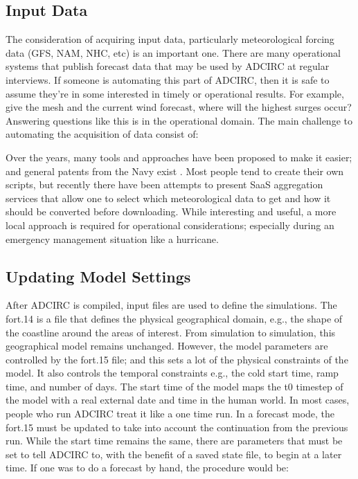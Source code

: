 \documentclass{article}
\begin{document}
\subsection{Input Data}

The consideration of acquiring input data, particularly meteorological forcing
data (GFS, NAM, NHC, etc) is an important one. There are many operational
systems that publish forecast data that may be used by ADCIRC at regular
interviews. If someone is automating this part of ADCIRC, then it is safe to
assume they're in some interested in timely or operational results. For example,
give the mesh and the current wind forecast, where will the highest surges
occur? Answering questions like this is in the operational domain.  The main
challenge to automating the acquisition of data consist of:

Over the years, many tools and approaches have been proposed to make it easier;
and general patents from the Navy exist \cite{}. Most people tend to create
their own scripts, but recently there have been attempts to present SaaS
aggregation services that allow one to select which meteorological data to get
and how it should be converted before downloading. While interesting and useful,
a more local approach is required for operational considerations; especially
during an emergency management situation like a hurricane.

\subsection{Updating Model Settings}

After ADCIRC is compiled, input files are used to define the simulations. The
fort.14 is a file that defines the physical geographical domain, e.g., the shape
of the coastline around the areas of interest. From simulation to simulation,
this geographical model remains unchanged.  However, the model parameters are
controlled by the fort.15 file; and this sets a lot of the physical constraints
of the model. It also controls the temporal constraints e.g., the cold start
time, ramp time, and number of days. The start time of the model maps the t0
timestep of the model with a real external date and time in the human world. In
most cases, people who run ADCIRC treat it like a one time run.  In a forecast
mode, the fort.15 must be updated to take into account the continuation from the
previous run. While the start time remains the same, there are parameters that
must be set to tell ADCIRC to, with the benefit of a saved state file, to begin
at a later time.  If one was to do a forecast by hand, the procedure would be:
\end{document}
